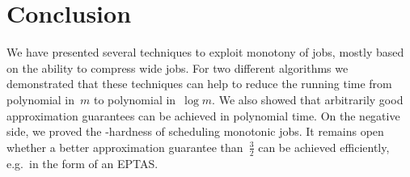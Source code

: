 \section*{Conclusion}

We have presented several techniques to exploit monotony of jobs,
mostly based on the ability to compress wide jobs.
For two different algorithms we demonstrated that these techniques can help to reduce the running time
from polynomial in~$m$ to polynomial in~$\log m$.
We also showed that arbitrarily good approximation guarantees can be achieved in polynomial time.
On the negative side, we proved the -hardness of scheduling monotonic jobs.
It remains open whether a better approximation guarantee than~$\frac{3}{2}$
can be achieved efficiently, e.g.~in the form of an EPTAS.
